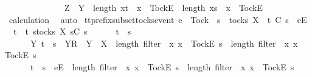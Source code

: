 \ \ \ \ \ \ \ \ \ \ \ \ \ \ Z\ {\isasymsubseteq}\ Y\ {\isasymand}\ length\ {\isacharbrackleft}x{\isasymleftarrow}t\ {\isachardot}\ x\ {\isacharequal}\ {\isacharbrackleft}Tock{\isacharbrackright}\isactrlsub E{\isacharbrackright}\ {\isacharequal}\ length\ {\isacharbrackleft}x{\isasymleftarrow}s\ {\isachardot}\ x\ {\isacharequal}\ {\isacharbrackleft}Tock{\isacharbrackright}\isactrlsub E{\isacharbrackright}{\isacharparenright}{\isacharparenright}{\isacharparenright}{\isachardoublequoteclose}\isanewline
\ \ \ \ \isamarkupfalse%
\ calculation\ \isamarkupfalse%
\ auto\isanewline
{}\isamarkupfalse%
%
\endisatagproof
{\isafoldproof}%
%
\isadelimproof
\isanewline
%
\endisadelimproof
\isanewline
{}\isamarkupfalse%
\ tt{\isacharunderscore}prefix{\isacharunderscore}subset{\isacharunderscore}tocks{\isacharunderscore}event{\isacharcolon}\ {\isachardoublequoteopen}e\ {\isasymnoteq}\ Tock\ {\isasymLongrightarrow}\ s\ {\isasymin}\ tocks\ X\ {\isasymLongrightarrow}\ t\ {\isasymlesssim}\isactrlsub C\ s\ {\isacharat}\ {\isacharbrackleft}{\isacharbrackleft}e{\isacharbrackright}\isactrlsub E{\isacharbrackright}\ {\isasymLongrightarrow}\isanewline
\ \ t\ {\isasymin}\ {\isacharbraceleft}t{\isachardot}\ {\isasymexists}s{\isacharprime}{\isasymin}tocks\ X{\isachardot}\ s{\isacharprime}{\isasymlesssim}\isactrlsub C\ s\ {\isasymand}\ \isanewline
\ \ \ \ {\isacharparenleft}t\ {\isacharequal}\ s{\isacharprime}\ {\isasymor}\ \isanewline
\ \ \ \ \ \ {\isacharparenleft}{\isasymexists}Y{\isachardot}\ t\ {\isacharequal}\ s{\isacharprime}\ {\isacharat}\ {\isacharbrackleft}{\isacharbrackleft}Y{\isacharbrackright}\isactrlsub R{\isacharbrackright}\ {\isasymand}\ Y\ {\isasymsubseteq}\ X\ {\isasymand}\ length\ {\isacharparenleft}filter\ {\isacharparenleft}{\isasymlambda}\ x{\isachardot}\ x\ {\isacharequal}\ {\isacharbrackleft}Tock{\isacharbrackright}\isactrlsub E{\isacharparenright}\ s{\isacharprime}{\isacharparenright}\ {\isacharless}\ length\ {\isacharparenleft}filter\ {\isacharparenleft}{\isasymlambda}\ x{\isachardot}\ x\ {\isacharequal}\ {\isacharbrackleft}Tock{\isacharbrackright}\isactrlsub E{\isacharparenright}\ s{\isacharparenright}{\isacharparenright}\ {\isasymor}\isanewline
\ \ \ \ \ \ {\isacharparenleft}t\ {\isacharequal}\ s{\isacharprime}\ {\isacharat}\ {\isacharbrackleft}{\isacharbrackleft}e{\isacharbrackright}\isactrlsub E{\isacharbrackright}\ {\isasymand}\ length\ {\isacharparenleft}filter\ {\isacharparenleft}{\isasymlambda}\ x{\isachardot}\ x\ {\isacharequal}\ {\isacharbrackleft}Tock{\isacharbrackright}\isactrlsub E{\isacharparenright}\ s{\isacharprime}{\isacharparenright}\ {\isacharequal}\ length\ {\isacharparenleft}filter\ {\isacharparenleft}{\isasymlambda}\ x{\isachardot}\ x\ {\isacharequal}\ {\isacharbrackleft}Tock{\isacharbrackright}\isactrlsub E{\isacharparenright}\ s{\isacharparenright}{\isacharparenright}{\isacharparenright}{\isacharbraceright}{\isachardoublequoteclose}\isanewline
